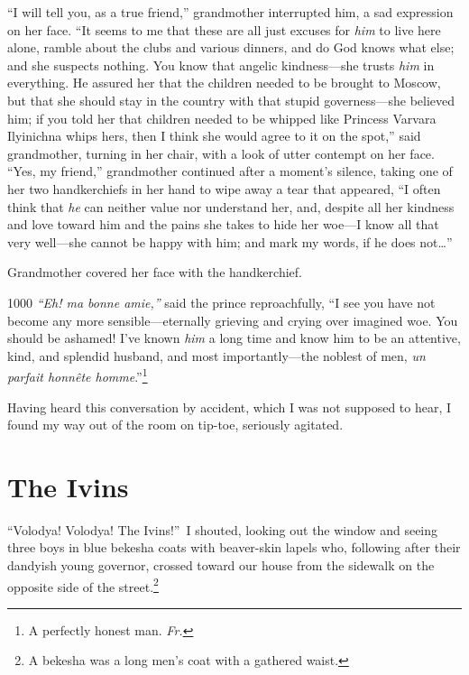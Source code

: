 ``I will tell you, as a true friend,'' grandmother interrupted him, a sad expression on her face. ``It seems to me that these are all just excuses for \emph{him} to live here alone, ramble about the clubs and various dinners, and do God knows what else; and she suspects nothing. You know that angelic kindness---she trusts \emph{him} in everything. He assured her that the children needed to be brought to Moscow, but that she should stay in the country with that stupid governess---she believed him; if you told her that children needed to be whipped like Princess Varvara Ilyinichna whips hers, then I think she would agree to it on the spot,'' said grandmother, turning in her chair, with a look of utter contempt on her face. ``Yes, my friend,'' grandmother continued after a moment's silence, taking one of her two handkerchiefs in her hand to wipe away a tear that appeared, ``I often think that \emph{he} can neither value nor understand her, and, despite all her kindness and love toward him and the pains she takes to hide her woe---I know all that very well---she cannot be happy with him; and mark my words, if he does not\ldots{}'' %

Grandmother covered her face with the handkerchief.

\begin{tolerant}{1000}
\textit{``Eh! ma bonne amie,''} said the prince reproachfully, ``I see you have not become any more sensible---eternally grieving and crying over imagined woe. You should be ashamed! I've known \emph{him} a long time and know him to be an attentive, kind, and splendid husband, and most importantly---the noblest of men, \textit{un parfait honn\^ete homme}.''\footnote{A perfectly honest man. \textit{Fr.}} %
\end{tolerant}

Having heard this conversation by accident, which I was not supposed to hear, I found my way out of the room on tip-toe, seriously agitated.

\chapter{The Ivins} %

``Volodya! Volodya! The Ivins!''~I shouted, looking out the window and seeing three boys in blue bekesha coats with beaver-skin lapels who, following after their dandyish young governor, crossed toward our house from the sidewalk on the opposite side of the street.\footnote{A bekesha was a long men's coat with a gathered waist.}

